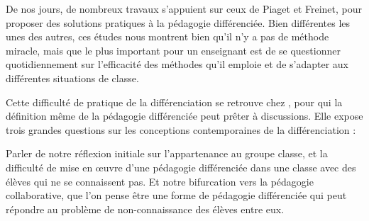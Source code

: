 De nos jours, de nombreux travaux s'appuient sur ceux de Piaget et Freinet, pour proposer des solutions pratiques à la pédagogie différenciée. Bien différentes les unes des autres, ces études nous montrent bien qu'il n'y a pas de méthode miracle, mais que le plus important pour un enseignant est de se questionner quotidiennement sur l'efficacité des méthodes qu'il emploie et de s'adapter aux différentes situations de classe.





Cette difficulté de pratique de la différenciation se retrouve chez \cite{kahn_pedagogie_2010}, pour qui la définition même de la pédagogie différenciée peut prêter à discussions. Elle expose trois grandes questions sur les conceptions contemporaines de la différenciation : 



Parler de notre réflexion initiale sur l'appartenance au groupe classe, et la difficulté de mise en œuvre d'une pédagogie différenciée dans une classe avec des élèves qui ne se connaissent pas. Et notre bifurcation vers la pédagogie collaborative, que l'on pense être une forme de pédagogie différenciée qui peut répondre au problème de non-connaissance des élèves entre eux.

\fancyhfoffset[L]{0cm}